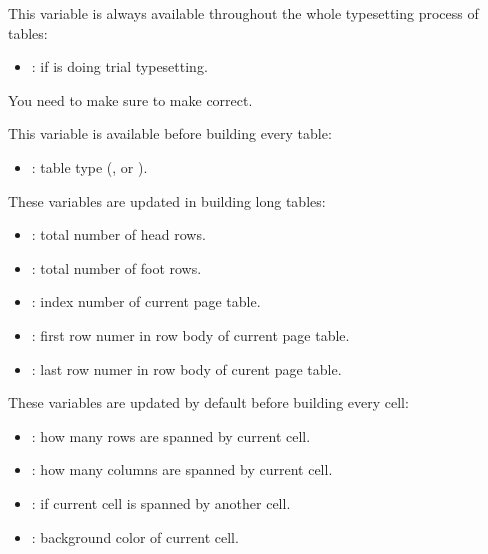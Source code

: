 \documentclass[oneside]{book}
\begin{document}
{This variable is always available throughout the whole typesetting process of tables:
\begin{itemize}[nosep]
  \item \CC{\lTblrMeasuringBool}: if  is doing trial typesetting.
\end{itemize}
You need to make sure  to make \CC{\lTblrMeasuringBool} correct.

This variable is available before building every table:
\begin{itemize}[nosep]
  \item \CC{\lTblrPortraitTypeTl}: table type (,  or ).
\end{itemize}

These variables are updated in building long tables:
\begin{itemize}[nosep]
  \item \CC{\lTblrRowHeadInt}: total number of head rows.
  \item \CC{\lTblrRowFootInt}: total number of foot rows.
  \item \CC{\lTblrTablePageInt}: index number of current page table.
  \item \CC{\lTblrRowFirstInt}: first row numer in row body of current page table.
  \item \CC{\lTblrRowLastInt}: last row numer in row body of curent page table.
\end{itemize}

These variables are updated by default before building every cell:
\begin{itemize}[nosep]
  \item \CC{\lTblrCellRowSpanInt}: how many rows are spanned by current cell.
  \item \CC{\lTblrCellColSpanInt}: how many columns are spanned by current cell.
  \item \CC{\lTblrCellOmittedBool}: if current cell is spanned by another cell.
  \item \CC{\lTblrCellBackgroundTl}: background color of current cell.
\end{itemize}

}
\end{document}
